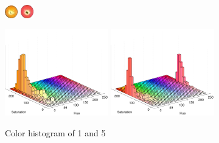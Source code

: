 \begin{figure}[H]
\centering
\subfloat
{
	\includegraphics[width=0.05\textwidth]{images/balls/1.png}
}
\hspace{0.4\textwidth}
\subfloat
{
	\includegraphics[width=0.05\textwidth]{images/balls/5.png}
}

\subfloat
{
	\includegraphics[width=0.4\textwidth]{images/ballhist/1}
}
\subfloat
{
	\includegraphics[width=0.4\textwidth]{images/ballhist/5}
}
\caption{Color histogram of 1 and 5}
\label{fig:}
\end{figure} 


